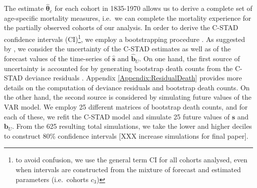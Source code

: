 \documentclass[11pt, a4paper]{article}
\begin{document}
The estimate $\hat{\bm{\theta}}_c$ for each cohort in 1835-1970 allows us to derive a complete set of age-specific mortality measures, i.e.~we can complete the mortality experience for the partially observed cohorts of our analysis. In order to derive the C-STAD confidence intervals (CI)\footnote{to avoid confusion, we use the general term CI for all cohorts analysed, even when intervals are constructed from the mixture of forecast and estimated parameters (i.e.~cohorts $c_3$)}, we employ a bootstrapping procedure \citep{efron1994introduction}. As suggested by \cite{keilman2006prediction}, we consider the uncertainty of the C-STAD estimates as well as of the forecast values of the time-series of $\hat{\bm{s}}$ and $\hat{\bm{b}}_U$. On one hand, the first source of uncertainty is accounted for by generating bootstrap death counts from the C-STAD deviance residuals \cite[as in, for example,][]{koissi2006evaluating,renshaw2008simulation,ouellette2012regional}. Appendix \ref{Appendix:ResidualDeath} provides more details on the computation of deviance residuals and bootstrap death counts. On the other hand, the second source is considered by simulating future values of the VAR model. We employ 25 different matrices of bootstrap death counts, and for each of these, we refit the C-STAD model and simulate 25 future values of $\bm{s}$ and $\bm{b}_U$. From the 625 resulting total simulations, we take the lower and higher deciles to construct 80\% confidence intervals [XXX increase simulations for final paper].


\end{document}
